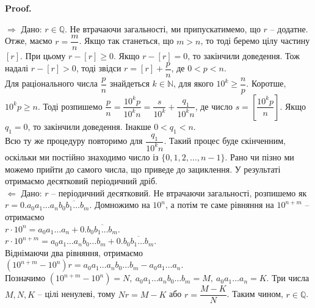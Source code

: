 \documentclass[a4paper, 14pt]{extarticle}
\makeatletter
\def\rightproof{$\boxed{\Rightarrow}$ }
\def\leftproof{$\boxed{\Leftarrow}$ }
\theoremstyle{theoremdd}
\theoremstyle{theoremdd}
\theoremstyle{theoremdd}
\theoremstyle{theoremdd}
\theoremstyle{theoremdd}
\theoremstyle{theoremdd}
\theoremstyle{theoremdd}
\theoremstyle{theoremdd}
\theoremstyle{theoremdd}
\theoremstyle{theoremdd}
\theoremstyle{theoremdd}
\theoremstyle{theoremdd}
\theoremstyle{theoremdd}
\theoremstyle{theoremdd}
\theoremstyle{theoremdd}
\theoremstyle{theoremdd}
\renewenvironment{proof}[1][Proof.\\]{\par
\pushQED{\hfill \qed}%
\normalfont \topsep6\p@\@plus6\p@\relax
\trivlist
\item\relax
{\bfseries
#1\@addpunct{.}}\hspace\labelsep\ignorespaces
}{%
\popQED\endtrivlist\@endpefalse
}
\makeatother
\begin{document}
\begin{proof}
\rightproof Дано: $r \in \mathbb{Q}$. Не втрачаючи загальності, ми припускатимемо, що $r$ -- додатне. Отже, маємо $r = \dfrac{m}{n}$. Якщо так станеться, що $m > n$, то тоді беремо цілу частину $[r]$. При цьому $r - [r] \geq 0$. Якщо $r - [r] = 0$, то закінчили доведення. Тож надалі $r - [r] > 0$, тоді звідси $r = [r] + \dfrac{p}{n}$, де $0 < p < n$.\\
Для раціонального числа $\dfrac{p}{n}$ знайдеться $k \in \mathbb{N}$, для якого $10^k \geq \dfrac{n}{p}$. Коротше, $10^k p \geq n$. Тоді розпишемо $\dfrac{p}{n} = \dfrac{10^k p}{10^k n} = \dfrac{s}{10^k} + \dfrac{q_1}{10^k n}$, де число $s = \left[ \dfrac{10^k p}{n} \right]$. Якщо $q_1 = 0$, то закінчили доведення. Інакше $0 < q_1 < n$.\\
Всю ту же процедуру повторимо для $\dfrac{q_1}{10^k n}$. Такий процес буде скінченним, оскільки ми постійно знаходимо число із $\{0,1,2,\dots,n-1\}$. Рано чи пізно ми можемо прийти до самого числа, що приведе до зациклення. У результаті отримаємо десятковий періодичний дріб.
\bigskip \\
\leftproof Дано: $r$ -- періодичний десятковий. Не втрачаючи загальності, розпишемо як $r = 0.a_0a_1\dots a_n \overline{b_0 b_1 \dots b_m}$. Домножимо на $10^n$, а потім те саме рівняння на $10^{n+m}$ -- отримаємо\\
$r \cdot 10^n = a_0a_1 \dots a_n + 0.\overline{b_0 b_1 \dots b_m}$.\\
$r \cdot 10^{n+m} = a_0a_1\dots a_n b_0 \dots b_m + 0.\overline{b_0 b_1 \dots b_m}$.\\
Віднімаючи два рівняння, отримаємо \\
$(10^{n+m} - 10^n) r = a_0a_1\dots a_n b_0 \dots b_m - a_0a_1 \dots a_n$.\\
Позначимо $(10^{n+m} - 10^n) = N,\ a_0a_1\dots a_n b_0 \dots b_m = M,\ a_0a_1 \dots a_n = K$. Три числа $M,N,K$ -- цілі ненулеві, тому $N r = M - K$ або $r = \dfrac{M-K}{N}$. Таким чином, $r \in \mathbb{Q}$.
\end{proof}
\end{document}
